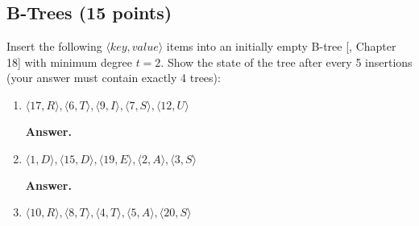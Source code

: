 \documentclass{article}
\begin{document}
\subsection{B-Trees (15 points)}

Insert the following $\langle key, value \rangle$ items into an initially empty B-tree [, Chapter 18] with minimum degree $t = 2$. Show the state of the tree after every 5 insertions (your answer must contain exactly 4 trees):
\begin{enumerate}
    \item $\langle 17, R \rangle, \langle 6, T \rangle, \langle 9, I \rangle, \langle 7, S \rangle, \langle 12, U \rangle$

    \textbf{Answer.}
    
    \begin{center}
    \end{center}
    
    \item $\langle 1, D \rangle, \langle 15, D \rangle, \langle 19, E \rangle, \langle 2, A \rangle, \langle 3, S \rangle$

    \textbf{Answer.}
    
    \begin{center}
    \end{center}
    
    \item $\langle 10, R \rangle, \langle 8, T \rangle, \langle 4, T \rangle, \langle 5, A \rangle, \langle 20, S \rangle$


\end{enumerate}
\end{document}
